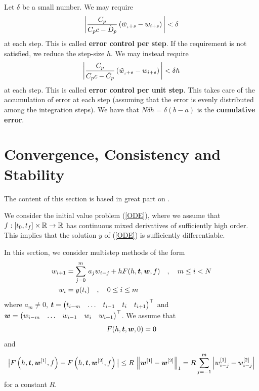 Let $\delta$ be a small number.  We may require
\[
\bigg| \frac{\displaystyle C_p}{\displaystyle C_pc-\tilde{D}_p}
\left( \tilde{w}_{_i+s} - w_{i+s} \right)  \bigg| < \delta
\]
at each step.  This is called
{\bfseries error control per step}.  If the requirement is not satisfied, we reduce the
step-size $h$.  We may instead require
\[
\bigg| \frac{\displaystyle C_p}{\displaystyle C_pc-\tilde{C}_p}
\left( \tilde{w}_{_i+s} - w_{i+s} \right)  \bigg| < \delta h
\]
at each step.  This is called
{\bfseries error control per unit step}.
This takes care of the accumulation of error at each step (assuming
that the error is evenly distributed among the integration steps).
We have that $N\delta h = \delta (b-a)$ is the
{\bfseries cumulative error}.

\section{Convergence, Consistency and Stability}\label{CCSyuk}

The content of this section is based in great part on \cite{I,IK}.

We consider the initial value problem (\ref{ODE}), where 
we assume that $f:[t_0,t_f]\times \mathbb{R} \rightarrow \mathbb{R}$ has continuous mixed
derivatives of sufficiently high order.  This
implies that the solution $y$ of (\ref{ODE}) is sufficiently
differentiable.

In this section, we consider multistep methods of the form
\begin{equation} \label{MSM_GF}
\begin{split}
w_{i+1} &= \sum_{j=0}^m\,a_jw_{i-j} + h F(h,\bm{t},\bm{w},f)
\quad, \quad m \leq i < N \\
w_i &= y(t_i) \quad, \quad 0 \leq i \leq m
\end{split}
\end{equation}
where $a_m \neq 0$,
$\displaystyle \bm{t}
=\begin{pmatrix} t_{i-m} & \ldots & t_{i-1} & t_i & t_{i+1} \end{pmatrix}^\top$
and 
$\displaystyle \bm{w}
=\begin{pmatrix} w_{i-m} & \ldots & w_{i-1} & w_i & w_{i+1} \end{pmatrix}^\top$.
We assume that
\begin{equation} \label{Fzero}
F(h,\bm{t},\bm{w},0) = 0
\end{equation}
and
\begin{equation} \label{FDP_Lip}
\big| F\left(h,\bm{t}, \bm{w}^{[1]},f\right) -
F\left(h,\bm{t},\bm{w}^{[2]},f\right) \big|
\leq R\,\left\|\bm{w}^{[1]} -\bm{w}^{[2]} \right\|_1
= R \sum_{j=-1}^m \left|w_{i-j}^{[1]}-w_{i-j}^{[2]}\right|
\end{equation}
for a constant $R$.


